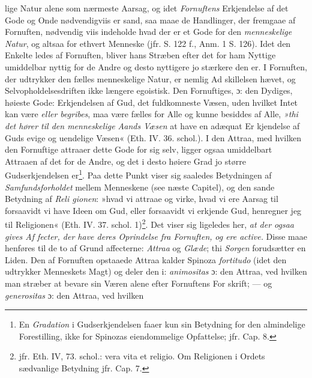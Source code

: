 \documentclass[12pt,a4paper]{book}
\newcommand{\opage}[1]{\marginnote{\footnotesize\textit{[#1]}}}
\begin{document}
lige Natur alene som nærmeste Aarsag, og idet \emph{Fornuftens}
Erkjendelse af det Gode og Onde nødvendigviis er sand, saa
maae de Handlinger, der fremgaae af Fornuften, nødvendig\-%
viis indeholde hvad der er et Gode for den \emph{menneskelige
Natur}, og altsaa for ethvert Menneske (jfr. S. 122 f., Anm. 1
S. 126). Idet den Enkelte ledes af Fornuften, bliver hans Stræben
efter det for ham Nyttige umiddelbar nyttig for de Andre
og desto nyttigere jo stærkere den er. I Fornuften, der
udtrykker den fælles menneskelige Natur, er nemlig Ad\-%
skillelsen hævet, og Selvopholdelsesdriften ikke længere
egoistisk. Den Fornuftiges, ɔ: den Dydiges, høieste Gode:
Erkjendelsen af Gud, det fuldkomneste Væsen, uden hvilket
Intet kan være \emph{eller begribes}, maa være fælles for Alle
og kunne besiddes af Alle, \emph{»thi det hører til den
menneskelige Aands Væsen} at have en adæquat Er\-%
kjendelse af Guds evige og uendelige Væsen« (Eth. IV. 36.
schol.). I den Attraa, med hvilken den Fornuftige attraaer
dette Gode for sig selv, ligger ogsaa umiddelbart Attraaen
af det for de Andre, og det i desto høiere Grad jo større
Gudserkjendelsen er\footnote{En \emph{Gradation} i Gudserkjendelsen faaer kun sin Betydning for den
almindelige Forestilling, ikke for Spinozas eiendommelige Opfattelse;
jfr. Cap. 8.}. Paa dette Punkt viser sig saaledes
Betydningen af \emph{Samfundsforholdet} mellem Menneskene
(see næste Capitel), og den sande Betydning af \emph{Reli\-%
gionen}: »hvad vi attraae og virke, hvad vi ere Aarsag til
forsaavidt vi have Ideen om Gud, eller forsaavidt vi erkjende
Gud, henregner jeg til Religionen« (Eth. IV. 37. schol. 1)\footnote{jfr. Eth. IV, 73. schol.: vera vita et religio. Om Religionen i Ordets
sædvanlige Betydning jfr. Cap. 7.}.
Det viser sig ligeledes her, \emph{at der ogsaa gives Af\-%
fecter, der have deres Oprindelse fra Fornuften,}
\opage{128} \setcounter{footnote}{0}%
\emph{og ere active.} Disse maae henføres til de to af Grund\-%
affecterne: \emph{Attraa} og \emph{Glæde}; thi \emph{Sorgen} forudsætter en
Liden. Den af Fornuften opstaaede Attraa kalder Spinoza
\emph{fortitudo} (idet den udtrykker Menneskets Magt) og deler
den i: \emph{animositas} ɔ: den Attraa, ved hvilken man
stræber at bevare sin Væren alene efter Fornuftens For\-%
skrift; --- og \emph{generositas} ɔ: den Attraa, ved hvilken
\end{document}
